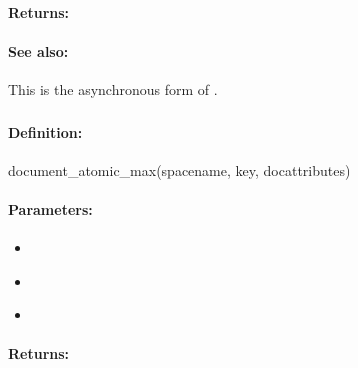 \paragraph{Returns:}


\paragraph{See also:}  This is the asynchronous form of .

\pagebreak
\subsubsection{}
\label{api:ruby:document_atomic_max}


\paragraph{Definition:}
\begin{rubycode}
document_atomic_max(spacename, key, docattributes)
\end{rubycode}

\paragraph{Parameters:}
\begin{itemize}[noitemsep]
\item {}\\

\item {}\\

\item {}\\

\end{itemize}

\paragraph{Returns:}


\pagebreak
\subsubsection{}
\label{api:ruby:async_document_atomic_max}


